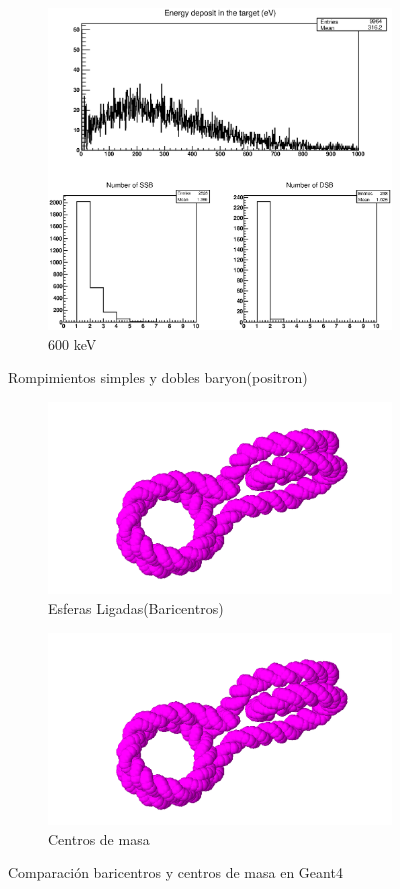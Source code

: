 \begin{figure}
\begin{subfigure}{.5\textwidth}
  \includegraphics[width=.78\linewidth]{./Figures/proton600kev.eps}
  \caption{600 keV}
  \label{fig:sub8}
\end{subfigure}
\caption[Rompimientos simples y dobles electrón(positron)]{Rompimientos simples y dobles baryon(positron)}
\label{fig:p}
\end{figure}

\begin{figure}
\centering
\begin{subfigure}{.5\textwidth}
  \centering
  \includegraphics[width=.78\linewidth]{./Figures/a.png}
  \caption{Esferas Ligadas(Baricentros)}
  \label{fig:su1}
\end{subfigure}%
\begin{subfigure}{.5\textwidth}
  \centering
  \includegraphics[width=.78\linewidth]{./Figures/a.png}
  \caption{Centros de masa}
  \label{fig:su2}
\end{subfigure}
\caption{Comparación baricentros y centros de masa en Geant4}
\label{fig:test3}
\end{figure}


